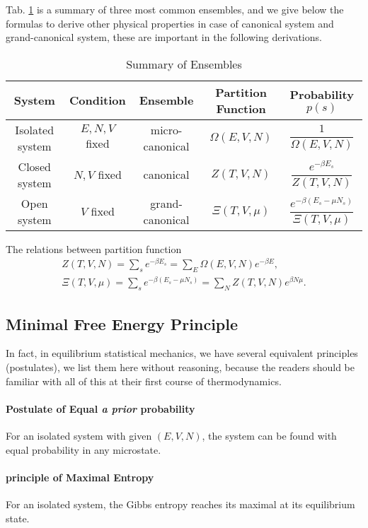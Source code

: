 Tab. \ref{tab:ensemble} is a summary of three most common ensembles, and we give below the formulas to derive other physical properties in case of canonical system and grand-canonical system, these are important in the following derivations.

\begin{table}[H]
	\caption{Summary of Ensembles}
	\label{tab:ensemble}
	\centering
	\begin{tabular}{ccccc}
		\toprule
		System & Condition & Ensemble & Partition Function & Probability $p(s)$\\
		\midrule
		Isolated system & $E,N,V$ fixed & micro-canonical & $\Omega(E,V,N)$ & $\dfrac{1}{\Omega(E,V,N)}$\\
		Closed system & $N,V$ fixed & canonical & $Z(T,V,N)$ & $\dfrac{e^{-\beta E_s} }{Z(T,V,N)}$\\
		Open system & $V$ fixed & grand-canonical & $\Xi(T,V,\mu)$&$\dfrac{e^{-\beta(E_s-\mu N_s)} }{ \Xi(T,V,\mu)}$\\
		\bottomrule
	\end{tabular}
\end{table}

The relations between partition function
\begin{equation*}
	\begin{split}
		Z(T,V,N) = \sum_s e^{-\beta E_s} =\sum_E \Omega(E,V,N)e^{-\beta E},\\
		\Xi(T,V,\mu) = \sum_s e^{-\beta (E_s  - \mu N_s)} = \sum_N Z(T,V,N)e^{\beta N\mu}.
	\end{split}
\end{equation*}

\subsection{Minimal Free Energy Principle}
In fact, in equilibrium statistical mechanics, we have several equivalent principles (postulates), we list them here without reasoning, because the readers should be familiar with all of this at their first course of thermodynamics.

\paragraph{Postulate of Equal \textit{a prior} probability}
For an isolated system with given $(E,V,N)$, the system can be found with equal probability in any microstate.
\paragraph{principle of Maximal Entropy}
For an isolated system, the Gibbs entropy reaches its maximal at its equilibrium state.
